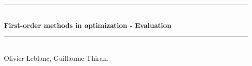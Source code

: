 \documentclass[10pt]{article}
\theoremstyle{definition}
\newcommand{\HRule}{\rule{\linewidth}{0.5mm}}
\begin{document}
\begin{center} %
 

\HRule \\[0.2cm]
{ \huge \bfseries First-order methods in optimization - Evaluation }\\[0.1cm] %
\HRule \\[0.4cm]
 
Olivier Leblanc, Guillaume Thiran. \\



\end{center}





\end{document}
